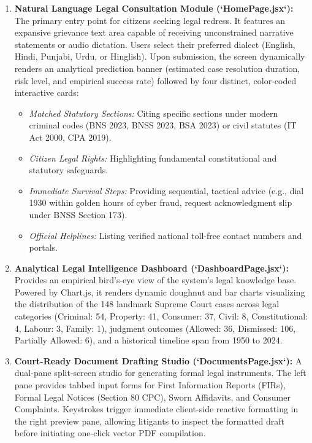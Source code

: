 \begin{enumerate}
    \item \textbf{Natural Language Legal Consultation Module (`HomePage.jsx`):}
    The primary entry point for citizens seeking legal redress. It features an expansive grievance text area capable of receiving unconstrained narrative statements or audio dictation. Users select their preferred dialect (English, Hindi, Punjabi, Urdu, or Hinglish). Upon submission, the screen dynamically renders an analytical prediction banner (estimated case resolution duration, risk level, and empirical success rate) followed by four distinct, color-coded interactive cards:
    \begin{itemize}
        \item \textit{Matched Statutory Sections:} Citing specific sections under modern criminal codes (BNS 2023, BNSS 2023, BSA 2023) or civil statutes (IT Act 2000, CPA 2019).
        \item \textit{Citizen Legal Rights:} Highlighting fundamental constitutional and statutory safeguards.
        \item \textit{Immediate Survival Steps:} Providing sequential, tactical advice (e.g., dial 1930 within golden hours of cyber fraud, request acknowledgment slip under BNSS Section 173).
        \item \textit{Official Helplines:} Listing verified national toll-free contact numbers and portals.
    \end{itemize}

    \item \textbf{Analytical Legal Intelligence Dashboard (`DashboardPage.jsx`):}
    Provides an empirical bird's-eye view of the system's legal knowledge base. Powered by Chart.js, it renders dynamic doughnut and bar charts visualizing the distribution of the 148 landmark Supreme Court cases across legal categories (Criminal: 54, Property: 41, Consumer: 37, Civil: 8, Constitutional: 4, Labour: 3, Family: 1), judgment outcomes (Allowed: 36, Dismissed: 106, Partially Allowed: 6), and a historical timeline span from 1950 to 2024.

    \item \textbf{Court-Ready Document Drafting Studio (`DocumentsPage.jsx`):}
    A dual-pane split-screen studio for generating formal legal instruments. The left pane provides tabbed input forms for First Information Reports (FIRs), Formal Legal Notices (Section 80 CPC), Sworn Affidavits, and Consumer Complaints. Keystrokes trigger immediate client-side reactive formatting in the right preview pane, allowing litigants to inspect the formatted draft before initiating one-click vector PDF compilation.


\end{enumerate}
